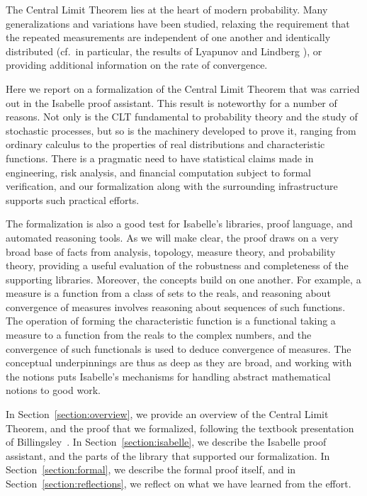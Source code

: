 \documentclass{svjour3}
\begin{document}
The Central Limit Theorem lies at the heart of modern probability. Many generalizations and variations have been studied, relaxing the requirement that the repeated measurements are independent of one another and identically distributed (cf.~in particular, the results of Lyapunov and Lindberg \cite{billingsley:95}), or providing additional information on the rate of convergence.

Here we report on a formalization of the Central Limit Theorem that was carried out in the Isabelle proof assistant. This result is noteworthy for a number of reasons. Not only is the CLT fundamental to probability theory and the study of stochastic processes, but so is the machinery developed to prove it, ranging from ordinary calculus to the properties of real distributions and characteristic functions. There is a pragmatic need to have statistical claims made in engineering, risk analysis, and financial computation subject to formal verification, and our formalization along with the surrounding infrastructure supports such practical efforts.

The formalization is also a good test for Isabelle's libraries, proof language, and automated reasoning tools. As we will make clear, the proof draws on a very broad base of facts from analysis, topology, measure theory, and probability theory, providing a useful evaluation of the robustness and completeness of the supporting libraries. Moreover, the concepts build on one another. For example, a measure is a function from a class of sets to the reals, and reasoning about convergence of measures involves reasoning about sequences of such functions. The operation of forming the characteristic function is a functional taking a measure to a function from the reals to the complex numbers, and the convergence of such functionals is used to deduce convergence of measures. The conceptual underpinnings are thus as deep as they are broad, and working with the notions puts Isabelle's mechanisms for handling abstract mathematical notions to good work.

In Section~\ref{section:overview}, we provide an overview of the Central Limit Theorem, and the proof that we formalized, following the textbook presentation of Billingsley~\cite{billingsley:95}. In Section~\ref{section:isabelle}, we describe the Isabelle proof assistant, and the parts of the library that supported our formalization. In Section~\ref{section:formal}, we describe the formal proof itself, and in Section~\ref{section:reflections}, we reflect on what we have learned from the effort. 
\end{document}
